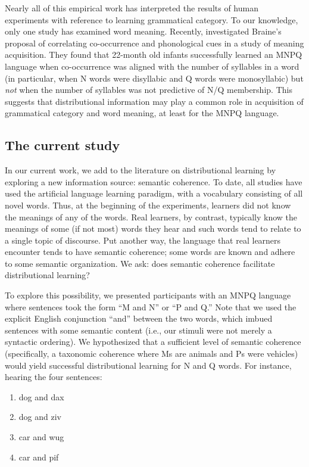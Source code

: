 \documentclass[man,floatsintext]{apa6}
\begin{document}
Nearly all of this empirical work has interpreted the results of human experiments with reference to learning grammatical category. To our knowledge, only one study has examined word meaning. Recently, \citet{lany2010} investigated Braine's proposal of correlating co-occurrence and phonological cues in a study of meaning acquisition. They found that 22-month old infants successfully learned an MNPQ language when co-occurrence was aligned with the number of syllables in a word (in particular, when N words were disyllabic and Q words were monosyllabic) but \emph{not} when the number of syllables was not predictive of N/Q membership. This suggests that distributional information may play a common role in acquisition of grammatical category and word meaning, at least for the MNPQ language.

\subsection{The current study}

In our current work, we add to the literature on distributional learning by exploring a new information source: semantic coherence. To date, all studies have used the artificial language learning paradigm, with a vocabulary consisting of all novel words. Thus, at the beginning of the experiments, learners did not know the meanings of any of the words. Real learners, by contrast, typically know the meanings of some (if not most) words they hear and such words tend to relate to a single topic of discourse. Put another way, the language that real learners encounter tends to have semantic coherence; some words are known and adhere to some semantic organization. We ask: does semantic coherence facilitate distributional learning?

To explore this possibility, we presented participants with an MNPQ language where sentences took the form ``M and N'' or ``P and Q.'' Note that we used the explicit English conjunction ``and'' between the two words, which imbued sentences with some semantic content (i.e., our stimuli were not merely a syntactic ordering). We hypothesized that a sufficient level of semantic coherence (specifically, a taxonomic coherence where Ms are animals and Ps were vehicles) would yield successful distributional learning for N and Q words. For instance, hearing the four sentences:

\begin{enumerate}
\item dog and dax
\item dog and ziv
\item car and wug
\item car and pif
\end{enumerate}
\end{document}
